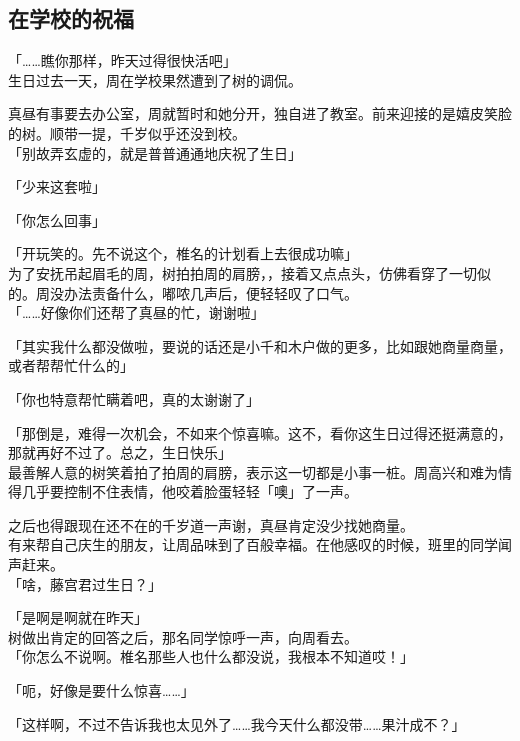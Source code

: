 \subsection{在学校的祝福}

「……瞧你那样，昨天过得很快活吧」\\

生日过去一天，周在学校果然遭到了树的调侃。

真昼有事要去办公室，周就暂时和她分开，独自进了教室。前来迎接的是嬉皮笑脸的树。顺带一提，千岁似乎还没到校。\\

「别故弄玄虚的，就是普普通通地庆祝了生日」

「少来这套啦」

「你怎么回事」

「开玩笑的。先不说这个，椎名的计划看上去很成功嘛」\\

为了安抚吊起眉毛的周，树拍拍周的肩膀，，接着又点点头，仿佛看穿了一切似的。周没办法责备什么，嘟哝几声后，便轻轻叹了口气。\\

「……好像你们还帮了真昼的忙，谢谢啦」

「其实我什么都没做啦，要说的话还是小千和木户做的更多，比如跟她商量商量，或者帮帮忙什么的」

「你也特意帮忙瞒着吧，真的太谢谢了」

「那倒是，难得一次机会，不如来个惊喜嘛。这不，看你这生日过得还挺满意的，那就再好不过了。总之，生日快乐」\\

最善解人意的树笑着拍了拍周的肩膀，表示这一切都是小事一桩。周高兴和难为情得几乎要控制不住表情，他咬着脸蛋轻轻「噢」了一声。

之后也得跟现在还不在的千岁道一声谢，真昼肯定没少找她商量。\\

有来帮自己庆生的朋友，让周品味到了百般幸福。在他感叹的时候，班里的同学闻声赶来。\\

「啥，藤宫君过生日？」

「是啊是啊就在昨天」\\

树做出肯定的回答之后，那名同学惊呼一声，向周看去。\\

「你怎么不说啊。椎名那些人也什么都没说，我根本不知道哎！」

「呃，好像是要什么惊喜……」

「这样啊，不过不告诉我也太见外了……我今天什么都没带……果汁成不？」

